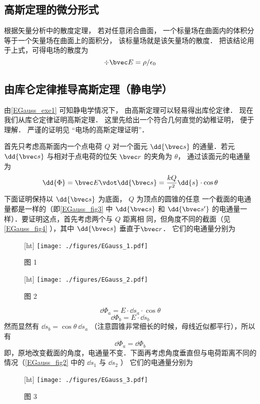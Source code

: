 \subsection{高斯定理的微分形式}

根据矢量分析中的散度定理， 若对任意闭合曲面， 一个标量场在曲面内的体积分等于一个矢量场在曲面上的面积分， 该标量场就是该矢量场的散度． 把该结论用于上式，可得电场的散度为
\begin{equation}
\div \bvec E = \rho / \epsilon_0
\end{equation}

\subsection{由库仑定律推导高斯定理（静电学）}
由\autoref{EGauss_exe1} 可知静电学情况下， 由高斯定理可以轻易得出库伦定律． 现在我们从库仑定律证明高斯定理． 这里先给出一个符合几何直觉的幼稚证明， 便于理解． 严谨的证明见 “电场的高斯定理证明”．

首先只考虑高斯面内一个点电荷 $Q$ 对一个面元 $\dd{\bvec s}$ 的通量．若元 $\dd{\bvec s}$ 与相对于点电荷的位矢 $\bvec r$ 的夹角为 $\theta$， 通过该面元的电通量为
\begin{equation}
\dd{\Phi} = \bvec E \vdot \dd{\bvec s} = \frac{kQ}{r^2} \dd{s} \cdot \cos \theta 
\end{equation} 
下面证明保持以 $\dd{\bvec s}$ 为底面， $Q$ 为顶点的圆锥的任意
一个截面的电通量都是一样的（即\autoref{EGauss_fig3} 中 $\dd{\bvec s}$ 和 $\dd{\bvec s'}$ 的电通量一样）．要证明这点，首先考虑两个与 $Q$ 距离相
同，但角度不同的截面（见\autoref{EGauss_fig4} ），其中 $\dd{\bvec s}$ 垂直于$\bvec r$． 它们的电通量分别为
\begin{figure}\label{EGauss_fig3}[ht]
\centering
\texttt{[image: ./figures/EGauss\_1.pdf]}
\caption{图 1}
\end{figure}
\begin{figure}\label{EGauss_fig4}[ht]
\centering
\texttt{[image: ./figures/EGauss\_2.pdf]}
\caption{图 2}
\end{figure}

\begin{equation}
\dd{\Phi_a} = E \cdot \dd{s_a} \cdot \cos \theta 
\end{equation} 
\begin{equation}
\dd{\Phi_b} = E \cdot \dd{s_b}
\end{equation}
然而显然有 $\dd{s_b} = \cos\theta \ \dd{s_a} $ （注意圆锥非常细长的时候，母线近似都平行），所以有
\begin{equation}
\dd{\Phi_a} = \dd{\Phi_b}
\end{equation} 
即，原地改变截面的角度，电通量不变．下面再考虑角度垂直但与电荷距离不同的情况（\autoref{EGauss_fig2} 中的 $\dd{s_1}$ 与 $\dd{s_2}$ ） 它们的电通量分别为
\begin{figure}\label{EGauss_fig2}[ht]
\centering
\texttt{[image: ./figures/EGauss\_3.pdf]}
\caption{图 3}
\end{figure}

